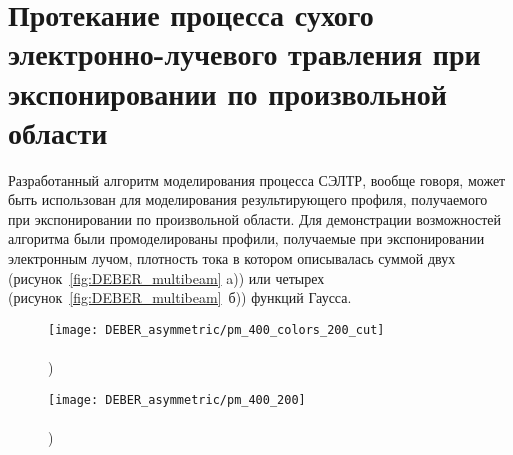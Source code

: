 \section{Протекание процесса сухого электронно-лучевого травления при экспонировании по произвольной области}

Разработанный алгоритм моделирования процесса СЭЛТР, вообще говоря, может быть использован для моделирования результирующего профиля, получаемого при экспонировании по произвольной области. Для демонстрации возможностей алгоритма были промоделированы профили, получаемые при экспонировании электронным лучом, плотность тока в котором описывалась суммой двух (рисунок~\ref{fig:DEBER_multibeam} a)) или четырех (рисунок~\ref{fig:DEBER_multibeam}~б)) функций Гаусса. 

\begin{figure}[t!]
	\begin{minipage}{0.48\textwidth}
		\texttt{[image: DEBER\_asymmetric/pm\_400\_colors\_200\_cut]} \\
		\vspace{-13em} \\ ) \\ \vspace{13em}
	\end{minipage}
	\begin{minipage}{0.48\textwidth}
		\texttt{[image: DEBER\_asymmetric/pm\_400\_200]} \\
		\vspace{-13em} \\ ) \\ \vspace{13em}
	\end{minipage}
	
	\vspace{-3em}
	

\end{figure}
